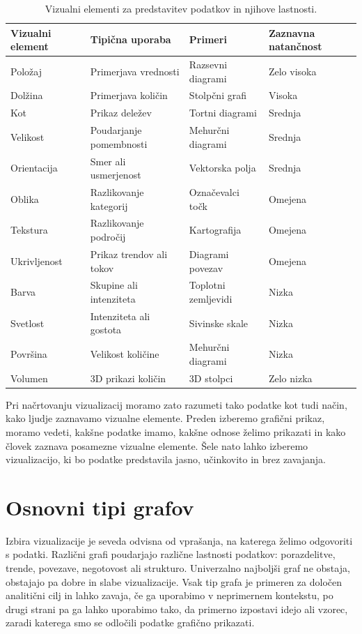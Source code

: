 \begin{table}[t]
\centering
\caption{Vizualni elementi za predstavitev podatkov in njihove lastnosti.
\protect\label{tab:vis-elements}}
\footnotesize
\begin{tabular}{p{2.0cm}p{3.0cm}p{3.0cm}p{1.7cm}}
\toprule
\textbf{Vizualni element} & \textbf{Tipična uporaba} & \textbf{Primeri} & \textbf{Zaznavna natančnost} \\
\midrule
Položaj & Primerjava vrednosti & Razsevni diagrami & Zelo visoka \\
Dolžina & Primerjava količin & Stolpčni grafi & Visoka \\
Kot & Prikaz deležev & Tortni diagrami & Srednja \\
Velikost & Poudarjanje pomembnosti & Mehurčni diagrami & Srednja \\
Orientacija & Smer ali usmerjenost & Vektorska polja & Srednja \\
Oblika & Razlikovanje kategorij & Označevalci točk & Omejena \\
Tekstura & Razlikovanje področij & Kartografija & Omejena \\
Ukrivljenost & Prikaz trendov ali tokov & Diagrami povezav & Omejena \\
Barva & Skupine ali intenziteta & Toplotni zemljevidi & Nizka \\
Svetlost & Intenziteta ali gostota & Sivinske skale & Nizka \\
Površina & Velikost količine & Mehurčni diagrami & Nizka \\
Volumen & 3D prikazi količin & 3D stolpci & Zelo nizka \\
\bottomrule
\end{tabular}
\end{table}

Pri načrtovanju vizualizacij moramo zato razumeti tako podatke kot tudi način, kako ljudje zaznavamo vizualne elemente. Preden izberemo grafični prikaz, moramo vedeti, kakšne podatke imamo, kakšne odnose želimo prikazati in kako človek zaznava posamezne vizualne elemente. Šele nato lahko izberemo vizualizacijo, ki bo podatke predstavila jasno, učinkovito in brez zavajanja.

\section{Osnovni tipi grafov}

Izbira vizualizacije je seveda odvisna od vprašanja, na katerega želimo odgovoriti s podatki. Različni grafi poudarjajo različne lastnosti podatkov: porazdelitve, trende, povezave, negotovost ali strukturo. Univerzalno najboljši graf ne obstaja, obstajajo pa dobre in slabe vizualizacije. Vsak tip grafa je primeren za določen analitični cilj in lahko zavaja, če ga uporabimo v neprimernem kontekstu, po drugi strani pa ga lahko uporabimo tako, da primerno izpostavi idejo ali vzorec, zaradi katerega smo se odločili podatke grafično prikazati. 

